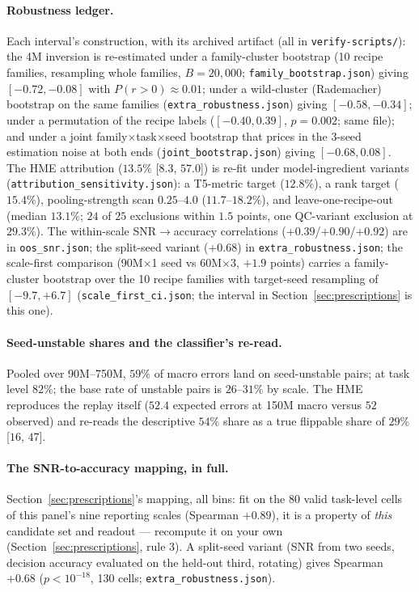 \paragraph{Robustness ledger.} Each interval's construction, with its archived artifact
(all in \texttt{verify-scripts/}): the 4M inversion is re-estimated under a family-cluster
bootstrap (10 recipe families, resampling whole families, $B = 20{,}000$; \texttt{family\_bootstrap.json})
giving $[-0.72, -0.08]$ with $P(r{>}0) \approx 0.01$; under a wild-cluster (Rademacher)
bootstrap on the same families (\texttt{extra\_robustness.json}) giving $[-0.58, -0.34]$; under a
permutation of the recipe labels ($[-0.40, 0.39]$, $p = 0.002$; same file); and under a joint
family$\times$task$\times$seed bootstrap that prices in the 3-seed estimation noise at both
ends (\texttt{joint\_bootstrap.json}) giving $[-0.68, 0.08]$. The HME attribution
($13.5\%$ [$8.3$, $57.0$]) is re-fit under model-ingredient variants
(\texttt{attribution\_sensitivity.json}): a T5-metric target ($12.8\%$), a rank target
($15.4\%$), pooling-strength scan $0.25$--$4.0$ ($11.7$--$18.2\%$), and leave-one-recipe-out
(median $13.1\%$; $24$ of $25$ exclusions within $1.5$ points, one QC-variant exclusion at
$29.3\%$). The within-scale SNR$\to$accuracy correlations ($+0.39$/$+0.90$/$+0.92$) are in
\texttt{oos\_snr.json}; the split-seed variant ($+0.68$) in \texttt{extra\_robustness.json};
the scale-first comparison (90M$\times$1 seed vs 60M$\times$3, $+1.9$ points) carries a
family-cluster bootstrap over the 10 recipe families with target-seed resampling of $[-9.7, +6.7]$ (\texttt{scale\_first\_ci.json}; the interval in Section~\ref{sec:prescriptions} is this one).

\paragraph{Seed-unstable shares and the classifier's re-read.}
Pooled over 90M--750M, $59\%$ of macro errors land on seed-unstable pairs; at task level
$82\%$; the base rate of unstable pairs is $26$--$31\%$ by scale. The HME reproduces the
replay itself ($52.4$ expected errors at 150M macro versus $52$ observed) and re-reads the
descriptive $54\%$ share as a true flippable share of $29\%$ [$16$, $47$].

\paragraph{The SNR-to-accuracy mapping, in full.}
Section~\ref{sec:prescriptions}'s mapping, all bins: fit on the 80 valid task-level cells of
this panel's nine reporting scales (Spearman $+0.89$), it is a property of \emph{this}
candidate set and readout ---
recompute it on your own (Section~\ref{sec:prescriptions}, rule 3). A split-seed variant (SNR from two seeds, decision accuracy evaluated on the held-out
third, rotating) gives Spearman $+0.68$ ($p < 10^{-18}$, 130 cells; \texttt{extra\_robustness.json}).

